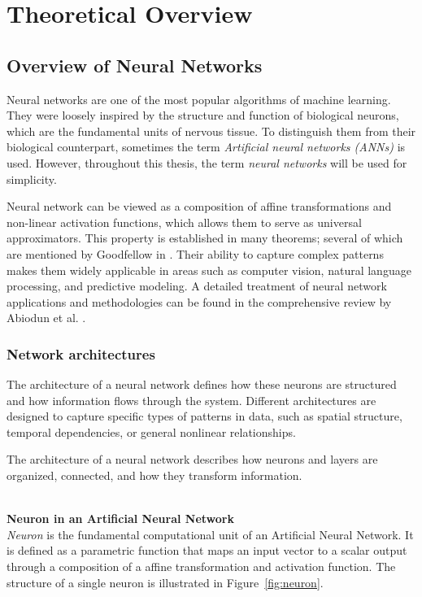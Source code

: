 \chapter{Theoretical Overview}


\section{Overview of Neural Networks}
\label{sec:overview-neural-networks}

Neural networks are one of the most popular algorithms of machine learning. They were loosely inspired by the structure and function of biological neurons, which are the fundamental units of nervous tissue. To distinguish them from their biological counterpart, sometimes the term \textit{Artificial neural networks (ANNs)} is used. However, throughout this thesis, the term \textit{neural networks} will be used for simplicity. 

Neural network can be viewed as a composition of affine transformations and non-linear activation functions, which allows them to serve as universal approximators. This property is established in many theorems; several of which are mentioned by Goodfellow in \cite{goodfellow2016}. Their ability to capture complex patterns makes them widely applicable in areas such as computer vision, natural language processing, and predictive modeling. A detailed treatment of neural network applications and methodologies can be found in the comprehensive review by Abiodun et al. \cite{abiodun2019}.

\subsection{Network architectures}
\label{sec:network-architectures}
The architecture of a neural network defines how these neurons are structured and how information flows through the system. Different architectures are designed to capture specific types of patterns in data, such as spatial structure, temporal dependencies, or general nonlinear relationships.

The architecture of a neural network describes how neurons and layers are organized, connected, and how they transform information.

\textbf{\\Neuron in an Artificial Neural Network\\} 
\emph{Neuron} is the fundamental computational unit of an Artificial Neural Network. It is defined as a parametric function that maps an input vector to a scalar output through a composition of a affine transformation and activation function. The structure of a single neuron is illustrated in Figure~\ref{fig:neuron}.

